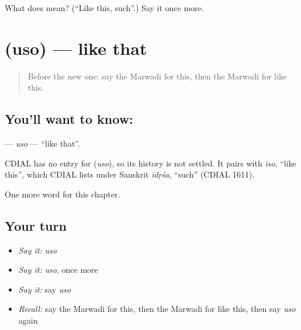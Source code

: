 \begin{tcolorbox}[breakable,colback=teal!4,colframe=teal!35!black,title={Before you move on}]
What does  mean? (\textquotedblleft{}Like this, such\textquotedblright{}.) Say it once more.
\end{tcolorbox}
\section[\texorpdfstring{\mw{उसो} (uso)}{उसो (uso)}]{ (uso) — like that}

\label{lesson:MW-C101-uso}



\begin{quote}
Before the new one: say the Marwadi for this, then the Marwadi for like this.
\end{quote}

\subsection*{You'll want to know: }
\textbf{} — \emph{uso} — \textquotedblleft{}like that\textquotedblright{}.

\begin{cousinweb}
CDIAL has no entry for \textbf{} (\emph{uso}), so its history is not settled. It pairs with \emph{iso}, \textquotedblleft{}like this\textquotedblright{}, which CDIAL lists under Sanskrit \emph{īdṛśa}, \textquotedblleft{}such\textquotedblright{} (CDIAL 1611).
\end{cousinweb}

\begin{grammarlens}[title={What you've built}]
One more word for this chapter.
\end{grammarlens}

\subsection*{Your turn}
\begin{itemize}
\raggedright
  \item \emph{Say it:} \emph{uso}
  \item \emph{Say it:} \emph{uso}, once more
  \item \emph{Say it:} say \emph{uso}
  \item \emph{Recall:} say the Marwadi for this, then the Marwadi for like this, then say \emph{uso} again
\end{itemize}


